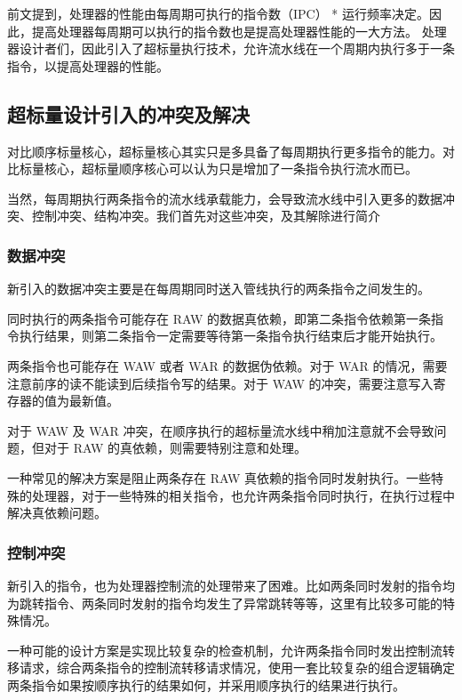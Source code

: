 前文提到，处理器的性能由每周期可执行的指令数（IPC） * 运行频率决定。因此，提高处理器每周期可以执行的指令数也是提高处理器性能的一大方法。
处理器设计者们，因此引入了超标量执行技术，允许流水线在一个周期内执行多于一条指令，以提高处理器的性能。

\subsection{超标量设计引入的冲突及解决}\label{sec:11-advanced-cpu-007}

对比顺序标量核心，超标量核心其实只是多具备了每周期执行更多指令的能力。对比标量核心，超标量顺序核心可以认为只是增加了一条指令执行流水而已。

当然，每周期执行两条指令的流水线承载能力，会导致流水线中引入更多的数据冲突、控制冲突、结构冲突。我们首先对这些冲突，及其解除进行简介

\subsubsection{数据冲突}\label{sec:11-advanced-cpu-008}

新引入的数据冲突主要是在每周期同时送入管线执行的两条指令之间发生的。

同时执行的两条指令可能存在 RAW 的数据真依赖，即第二条指令依赖第一条指令执行结果，则第二条指令一定需要等待第一条指令执行结束后才能开始执行。

两条指令也可能存在 WAW 或者 WAR 的数据伪依赖。对于 WAR 的情况，需要注意前序的读不能读到后续指令写的结果。对于 WAW 的冲突，需要注意写入寄存器的值为最新值。

对于 WAW 及 WAR 冲突，在顺序执行的超标量流水线中稍加注意就不会导致问题，但对于 RAW 的真依赖，则需要特别注意和处理。

一种常见的解决方案是阻止两条存在 RAW 真依赖的指令同时发射执行。一些特殊的处理器，对于一些特殊的相关指令，也允许两条指令同时执行，在执行过程中解决真依赖问题。

\subsubsection{控制冲突}\label{sec:11-advanced-cpu-009}

新引入的指令，也为处理器控制流的处理带来了困难。比如两条同时发射的指令均为跳转指令、两条同时发射的指令均发生了异常跳转等等，这里有比较多可能的特殊情况。

一种可能的设计方案是实现比较复杂的检查机制，允许两条指令同时发出控制流转移请求，综合两条指令的控制流转移请求情况，使用一套比较复杂的组合逻辑确定两条指令如果按顺序执行的结果如何，并采用顺序执行的结果进行执行。

